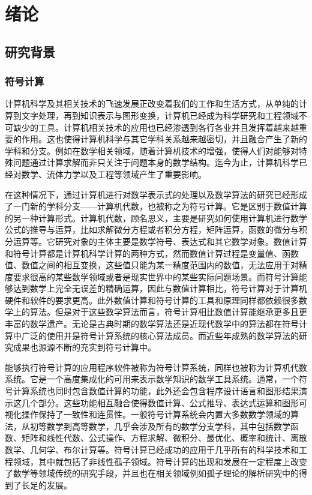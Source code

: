 \chapter{绪论}
\section{研究背景}
\subsection{符号计算}
计算机科学及其相关技术的飞速发展正改变着我们的工作和生活方式，从单纯的计算到文字处理，再到知识表示与图形变换，计算机已经成为科学研究和工程领域不可缺少的工具。计算机相关技术的应用也已经渗透到各行各业并且发挥着越来越重要的作用。这也使得计算机科学与其它学科关系越来越密切，并且融合产生了新的学科和分支。例如在数学相关领域，随着计算机技术的增强，使得人们对能够对特殊问题通过计算求解而非只关注于问题本身的数学结构。迄今为止，计算机科学已经对数学、流体力学以及工程等领域产生了重要影响。

在这种情况下，通过计算机进行对数学表示式的处理以及数学算法的研究已经形成了一门新的学科分支——计算机代数，也被称之为符号计算。它是区别于数值计算的另一种计算形式。计算机代数，顾名思义，主要是研究如何使用计算机进行数学公式的推导与运算，比如求解微分方程或者积分方程，矩阵运算，函数的微分与积分运算等。它研究对象的主体主要是数学符号、表达式和其它数学对象。数值计算和符号计算都是计算机科学计算的两种方式，然而数值计算过程是变量值、函数值、数值之间的相互变换，这些值只能为某一精度范围内的数值，无法应用于对精度要求很高的某些数学领域或者是现实世界中的某些实际问题场景。而符号计算能够达到数学上完全无误差的精确运算，因此与数值计算相比，符号计算对于计算机硬件和软件的要求更高。此外数值计算和符号计算的工具和原理同样都依赖很多数学上的算法。但是对于这些数学算法而言，符号计算相比数值计算能继承更多且更丰富的数学遗产。无论是古典时期的数学算法还是近现代数学中的算法都在符号计算中广泛的使用并是符号计算系统的核心算法成员。而近些年成熟的数学算法的研究成果也源源不断的充实到符号计算中。

能够执行符号计算的应用程序软件被称为符号计算系统，同样也被称为计算机代数系统。它是一个高度集成化的可用来表示数学知识的数学工具系统。通常，一个符号计算系统也同时包含数值计算的功能，此外还会包含程序设计语言和图形结果演示这几个部分。这些功能相互融合使得数值计算、公式推导、表达式运算和图形可视化操作保持了一致性和连贯性。一般符号计算系统会内置大多数数学领域的算法，从初等数学到高等数学，几乎会涉及所有的数学分支学科，其中包括数学函数、矩阵和线性代数、公式操作、方程求解、微积分、最优化、概率和统计、离散数学、几何学、布尔计算等。符号计算已经成功的应用于几乎所有的科学技术和工程领域，其中就包括了非线性孤子领域。符号计算的出现和发展在一定程度上改变了数学等领域传统的研究手段，并且也在相关领域例如孤子理论的解析研究中的得到了长足的发展。

